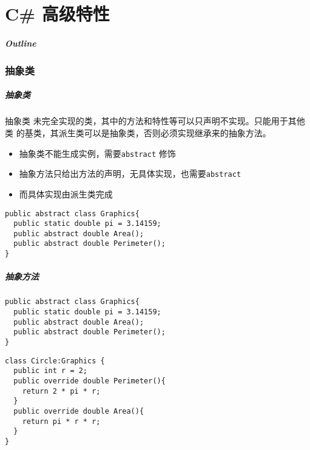 
\part{C\# 高级特性}
\begin{frame}
\frametitle{Outline}            %
\tableofcontents
\end{frame}

\section{抽象类}

\begin{frame}[fragile]
\frametitle{抽象类}
\begin{block}{抽象类}
  \CJKindent 未完全实现的类，其中的方法和特性等可以只声明不实现。只能用于其他类
  的基类，其派生类可以是抽象类，否则必须实现继承来的抽象方法。
\end{block}
\begin{itemize}
\item 抽象类不能生成实例，需要\texttt{abstract} 修饰
\item 抽象方法只给出方法的声明，无具体实现，也需要\texttt{abstract}
\item 而具体实现由派生类完成
\end{itemize}
\begin{lstlisting}
public abstract class Graphics{
  public static double pi = 3.14159;
  public abstract double Area();
  public abstract double Perimeter();
}
\end{lstlisting}
\end{frame}

\begin{frame}[fragile]
\frametitle{抽象方法}
\begin{lstlisting}
public abstract class Graphics{
  public static double pi = 3.14159;
  public abstract double Area();
  public abstract double Perimeter();
}
\end{lstlisting}
\begin{lstlisting}
class Circle:Graphics {
  public int r = 2;
  public override double Perimeter(){
    return 2 * pi * r;
  }
  public override double Area(){
    return pi * r * r;
  }
}
\end{lstlisting}
\end{frame}

